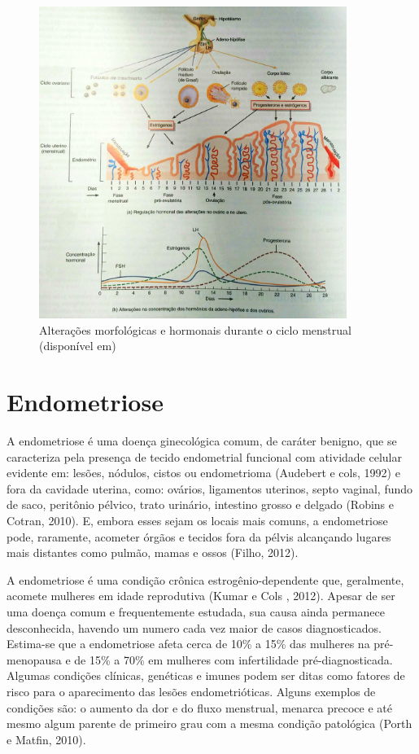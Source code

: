 \documentclass[12pt]{article} %
\begin{document}
\begin{figure}[h!]
\centering
\includegraphics[width=10cm]{ciclo.jpg}
\caption[Alterações morfológicas e hormonais durante o ciclo menstrual]{ Alterações morfológicas e hormonais durante o ciclo menstrual (disponível em) } 
\label{ciclo menstrual}
\end{figure} 

\section{Endometriose}

A endometriose é uma doença ginecológica comum, de caráter benigno,
que se caracteriza pela presença de tecido endometrial funcional com
atividade celular evidente em: lesões, nódulos, cistos ou
endometrioma (Audebert e cols, 1992) e fora da cavidade uterina, como:
ovários, ligamentos uterinos, septo vaginal, fundo de saco, peritônio
pélvico, trato urinário, intestino grosso e delgado (Robins e Cotran, 2010). E, embora
esses sejam os locais mais comuns, a endometriose pode, raramente,
acometer órgãos e tecidos fora da pélvis alcançando lugares mais distantes 
 como pulmão, mamas e ossos (Filho,
2012).  %

A endometriose é uma condição crônica estrogênio-dependente que,
geralmente, acomete mulheres em idade reprodutiva (Kumar e Cols ,
2012). Apesar de ser uma doença comum e frequentemente estudada, sua
causa ainda permanece desconhecida, havendo um numero cada vez maior
de casos diagnosticados. Estima-se que a endometriose afeta cerca de 10\% a
15\% das mulheres na pré-menopausa e de 15\% a 70\% em mulheres com
infertilidade pré-diagnosticada. Algumas condições clínicas, genéticas
e imunes podem ser ditas como fatores de risco para o aparecimento das
lesões endometrióticas. Alguns exemplos de condições são: o aumento da
dor e do fluxo menstrual, menarca precoce e até mesmo algum parente de
primeiro grau com a mesma condição patológica (Porth e Matfin, 2010).
\end{document}
